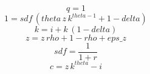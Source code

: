 \begin{dmath}
{q}=1
\end{dmath}
\begin{dmath}
1={sdf}\, \left({theta}\, {z}\, {k}^{{theta}-1}+1-{delta}\right)
\end{dmath}
\begin{dmath}
{k}={i}+{k}\, \left(1-{delta}\right)
\end{dmath}
\begin{dmath}
{z}={z}\, {rho}+1-{rho}+{eps\_z}
\end{dmath}
\begin{dmath}
{sdf}=\frac{1}{1+{r}}
\end{dmath}
\begin{dmath}
{c}={z}\, {k}^{{theta}}-{i}
\end{dmath}
